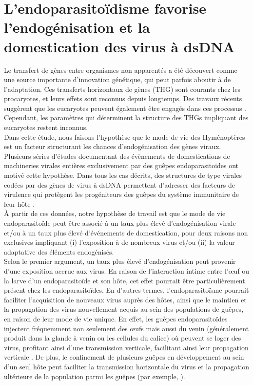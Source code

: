\chapter{L'endoparasitoïdisme favorise l'endogénisation et la domestication des virus à dsDNA}

Le transfert de gènes entre organismes non apparentés a été découvert comme une source importante d'innovation génétique, qui peut parfois aboutir à de l'adaptation. Ces transferts horizontaux de gènes (THG) sont courants chez les procaryotes, et leurs effets sont reconnus depuis longtemps. Des travaux récents suggèrent que les eucaryotes peuvent également être engagés dans ces processus \citep{irwin_systematic_2022}. Cependant, les paramètres qui déterminent la structure des THGs impliquant des eucaryotes restent inconnus.\\

Dans cette étude, nous faisons l'hypothèse que le mode de vie des Hyménoptères est un facteur structurant les chances d'endogénisation des gènes viraux. Plusieurs séries d’études documentant des évènements de domestications de machineries virales entières exclusivement par des guêpes endoparasitoïdes ont motivé cette hypothèse. Dans tous les cas décrits, des structures de type virales codées par des gènes de virus à dsDNA permettent d’adresser des facteurs de virulence qui protègent les progéniteurs des guêpes du système immunitaire de leur hôte \citep{bezier_polydnaviruses_2009,volkoff_analysis_2010,burke_common_2019,pichon_recurrent_2015,di_giovanni_behavior-manipulating_2020}. \\

À partir de ces données, notre hypothèse de travail est que le mode de vie endoparasitoïde peut être associé à un taux plus élevé d'endogénisation virale et/ou à un taux plus élevé d'événements de domestication, pour deux raisons non exclusives impliquant (i) l'exposition à de nombreux virus et/ou (ii) la valeur adaptative des éléments endogénisés.\\

Selon le premier argument, un taux plus élevé d'endogénisation peut provenir d'une exposition accrue aux virus. En raison de l'interaction intime entre l'œuf ou la larve d'un endoparasitoïde et son hôte, cet effet pourrait être particulièrement présent chez les endoparasitoïdes. En d'autres termes, l'endoparasitoïsme pourrait faciliter l'acquisition de nouveaux virus auprès des hôtes, ainsi que le maintien et la propagation des virus nouvellement acquis au sein des populations de guêpes, en raison de leur mode de vie unique. En effet, les guêpes endoparasitoïdes injectent fréquemment non seulement des œufs mais aussi du venin (généralement produit dans la glande à venin ou les cellules du calice) où peuvent se loger des virus, profitant ainsi d'une transmission verticale, facilitant ainsi leur propagation verticale \citep{martinez_additional_2016,coffman_viral_2022}. De plus, le confinement de plusieurs guêpes en développement au sein d'un seul hôte peut faciliter la transmission horizontale du virus et la propagation ultérieure de la population parmi les guêpes (par exemple, \citep{varaldi_infectious_2003,coffman_viral_2022}).\\


